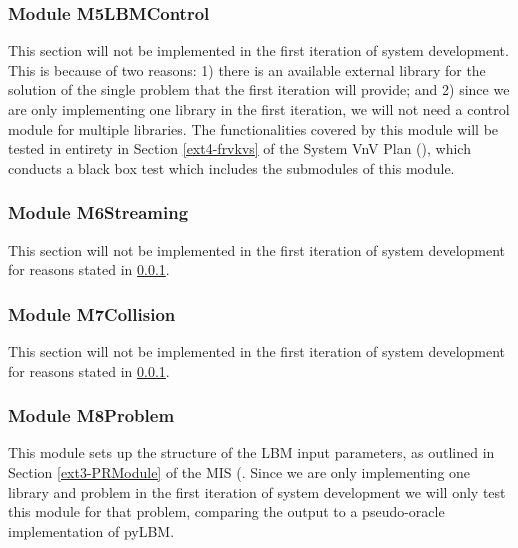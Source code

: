 \documentclass[12pt, titlepage]{article}
\begin{document}
\subsubsection{Module M5LBMControl}
\label{UTDMF}
This section will not be implemented in the first iteration of system development. This is because of two reasons: 1) there is an available external library for the solution of the single problem that the first iteration will provide; and 2) since we are only implementing one library in the first iteration, we will not need a control module for multiple libraries. The functionalities covered by this module will be tested in entirety in Section \ref{ext4-frvkvs} of the System VnV Plan (\citet{LBM_SVNV_PM}), which conducts a black box test which includes the submodules of this module.


\subsubsection{Module M6Streaming}

This section will not be implemented in the first iteration of system development for reasons stated in \ref{UTDMF}.

\subsubsection{Module M7Collision}

This section will not be implemented in the first iteration of system development for reasons stated in \ref{UTDMF}.

\subsubsection{Module M8Problem}
\label{m8problemmoduletest}

This module sets up the structure of the LBM input parameters, as outlined in Section \ref{ext3-PRModule} of the MIS (\citet{LBM_MIS_PM}. Since we are only implementing one library and problem in the first iteration of system development we will only test this module for that problem, comparing the output to a pseudo-oracle implementation of pyLBM.
\end{document}
